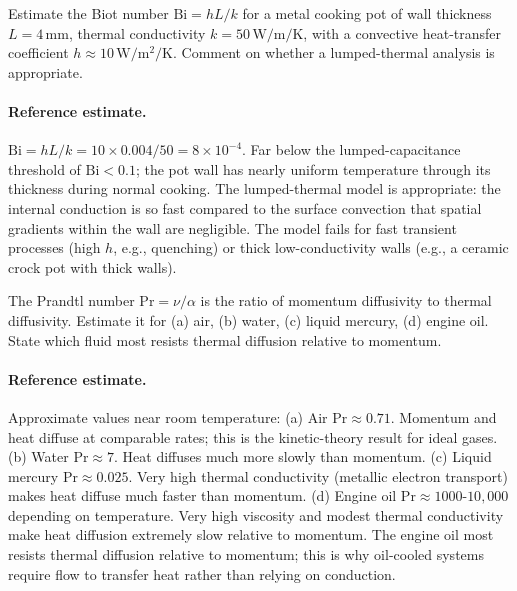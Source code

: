 \begin{exercise}
Estimate the Biot number $\mathrm{Bi} = h L / k$ for a metal cooking
pot of wall thickness $L = 4 \,\si{\milli\meter}$, thermal
conductivity $k = 50 \,\si{\watt\per\meter\per\kelvin}$, with a
convective heat-transfer coefficient $h \approx 10 \,\si{\watt\per
\meter\squared\per\kelvin}$. Comment on whether a lumped-thermal
analysis is appropriate.

\paragraph{Reference estimate.}
$\mathrm{Bi} = h L / k = 10 \times 0.004 / 50 = 8 \times 10^{-4}$.
Far below the lumped-capacitance threshold of $\mathrm{Bi} < 0.1$;
the pot wall has nearly uniform temperature through its thickness
during normal cooking. The lumped-thermal model is appropriate: the
internal conduction is so fast compared to the surface convection
that spatial gradients within the wall are negligible. The model
fails for fast transient processes (high $h$, e.g., quenching) or
thick low-conductivity walls (e.g., a ceramic crock pot with thick
walls).
\end{exercise}

\begin{exercise}
The Prandtl number $\mathrm{Pr} = \nu / \alpha$ is the ratio of
momentum diffusivity to thermal diffusivity. Estimate it for (a)
air, (b) water, (c) liquid mercury, (d) engine oil. State which
fluid most resists thermal diffusion relative to momentum.

\paragraph{Reference estimate.}
Approximate values near room temperature:
(a) Air $\mathrm{Pr} \approx 0.71$. Momentum and heat diffuse at
comparable rates; this is the kinetic-theory result for ideal gases.
(b) Water $\mathrm{Pr} \approx 7$. Heat diffuses much more slowly
than momentum.
(c) Liquid mercury $\mathrm{Pr} \approx 0.025$. Very high thermal
conductivity (metallic electron transport) makes heat diffuse much
faster than momentum.
(d) Engine oil $\mathrm{Pr} \approx 1000$-$10{,}000$ depending on
temperature. Very high viscosity and modest thermal conductivity
make heat diffusion extremely slow relative to momentum.
The engine oil most resists thermal diffusion relative to momentum;
this is why oil-cooled systems require flow to transfer heat rather
than relying on conduction.
\end{exercise}

